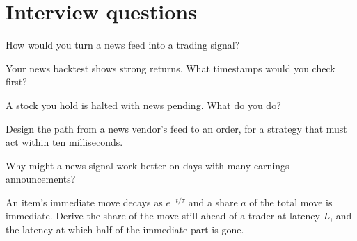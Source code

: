 \section{Interview questions}

\begin{interviewq}\label{iq:s1:news-and-events:1}
How would you turn a news feed into a trading signal?
\end{interviewq}

\begin{interviewq}\label{iq:s1:news-and-events:2}
Your news backtest shows strong returns. What timestamps would you check first?
\end{interviewq}

\begin{interviewq}\label{iq:s1:news-and-events:3}
A stock you hold is halted with news pending. What do you do?
\end{interviewq}

\begin{interviewq}\label{iq:s1:news-and-events:4}
Design the path from a news vendor's feed to an order, for a strategy that must act within ten milliseconds.
\end{interviewq}

\begin{interviewq}\label{iq:s1:news-and-events:5}
Why might a news signal work better on days with many earnings announcements?
\end{interviewq}

\begin{interviewq}\label{iq:s1:news-and-events:6}
An item's immediate move decays as $e^{-t/\tau}$ and a share $a$ of the total move is immediate. Derive the share of the move still ahead of a trader at
latency $L$, and the latency at which half of the immediate part is gone.
\end{interviewq}
